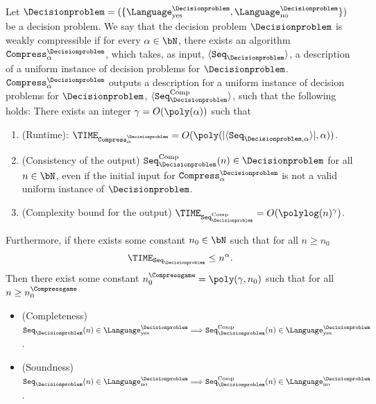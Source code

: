 \begin{definition}  \label{def:weaklycompressibleproblem}
	Let $\Decisionproblem = (\{\Language_{\text{yes}}^{\Decisionproblem}, \Language_{\text{no}}^{\Decisionproblem}\})$ be a decision problem. We say that the decision problem $\Decisionproblem$ is weakly compressible if for every $\alpha \in \bN $, there exists an algorithm $\texttt{Compress}_{\alpha}^{\Decisionproblem}$, which takes, as input, $\langle \texttt{Seq}_{\Decisionproblem} \rangle$, a description of a uniform instance of decision problems for $\Decisionproblem$. $\texttt{Compress}_{\alpha}^{\Decisionproblem}$ outputs a description for a uniform instance of decision problems for $\Decisionproblem$, $\langle\texttt{Seq}^{\text{Comp}}_{\Decisionproblem}\rangle$, such that the following holds:
	There exists an integer $\gamma= O(\poly(\alpha))$ such that
	\begin{enumerate}
		\item (Runtime): $\TIME_{\texttt{Compress}_{\alpha}^{\Decisionproblem}} = O(\poly(|\langle\texttt{Seq}_{\Decisionproblem, \alpha }\rangle|, \alpha))$. 
		\item (Consistency of the output) $\texttt{Seq}^{\text{Comp}}_{\Decisionproblem}(n) \in \Decisionproblem$ for all $n \in \bN$, even if the initial input for $\texttt{Compress}_{\alpha}^{\Decisionproblem}$ is not a valid uniform instance of $\Decisionproblem$. 
		\item (Complexity bound for the output) $\TIME_{\texttt{Seq}^{\text{Comp}}_{\Decisionproblem}} = O(\polylog(n)^{\gamma})$.
	\end{enumerate}
	Furthermore, if there exists some constant $n_0 \in \bN$ such that for all $n \geq n_0$
	\begin{equation} 
		\TIME_{\texttt{Seq}_{\Decisionproblem}} \leq n^\alpha. 
	\end{equation}
	Then there exist some constant $n_0^{\Compressgame} = \poly(\gamma, n_0)$ such that for all $n \geq n_0^{\Compressgame}$
	\begin{itemize}
		\item (Completeness) $\texttt{Seq}_{\Decisionproblem}(n) \in\Language_{\text{yes}}^{\Decisionproblem} \Longrightarrow \texttt{Seq}_{\Decisionproblem}^{\text{Comp}}(n) \in\Language_{\text{yes}}^{\Decisionproblem}$.
		\item (Soundness) $\texttt{Seq}_{\Decisionproblem}(n) \in\Language_{\text{no}}^{\Decisionproblem} \Longrightarrow \texttt{Seq}_{\Decisionproblem}^{\text{Comp}}(n) \in\Language_{\text{no}}^{\Decisionproblem}$.
	\end{itemize}
\end{definition}

